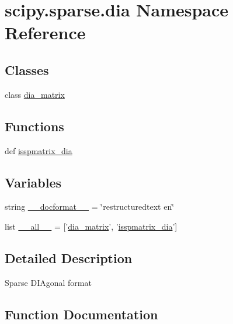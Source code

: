 \hypertarget{namespacescipy_1_1sparse_1_1dia}{}\section{scipy.\+sparse.\+dia Namespace Reference}
\label{namespacescipy_1_1sparse_1_1dia}
\subsection*{Classes}
\begin{DoxyCompactItemize}
\item 
class \hyperlink{classscipy_1_1sparse_1_1dia_1_1dia__matrix}{dia\+\_\+matrix}
\end{DoxyCompactItemize}
\subsection*{Functions}
\begin{DoxyCompactItemize}
\item 
def \hyperlink{namespacescipy_1_1sparse_1_1dia_a8162a1dff08387cefe6f105f4ce2224f}{isspmatrix\+\_\+dia}
\end{DoxyCompactItemize}
\subsection*{Variables}
\begin{DoxyCompactItemize}
\item 
string \hyperlink{namespacescipy_1_1sparse_1_1dia_a6b3020e6f1b4f3586e4e7cec8dfb0976}{\+\_\+\+\_\+docformat\+\_\+\+\_\+} = \char`\"{}restructuredtext en\char`\"{}
\item 
list \hyperlink{namespacescipy_1_1sparse_1_1dia_ada1b0d5ab89a79520e11ee76f4e66622}{\+\_\+\+\_\+all\+\_\+\+\_\+} = \mbox{[}'\hyperlink{classscipy_1_1sparse_1_1dia_1_1dia__matrix}{dia\+\_\+matrix}', '\hyperlink{namespacescipy_1_1sparse_1_1dia_a8162a1dff08387cefe6f105f4ce2224f}{isspmatrix\+\_\+dia}'\mbox{]}
\end{DoxyCompactItemize}


\subsection{Detailed Description}
\begin{DoxyVerb}Sparse DIAgonal format\end{DoxyVerb}
 

\subsection{Function Documentation}
\hypertarget{namespacescipy_1_1sparse_1_1dia_a8162a1dff08387cefe6f105f4ce2224f}{}
